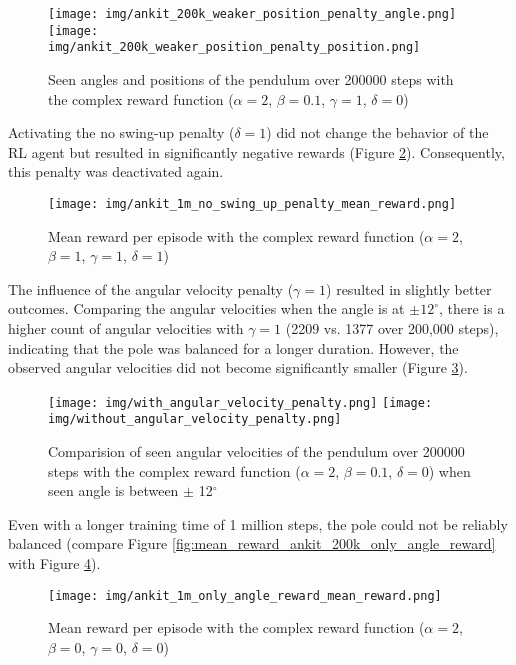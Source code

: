 \begin{figure}[htbp]
    \centering
    \texttt{[image: img/ankit\_200k\_weaker\_position\_penalty\_angle.png]}
    \texttt{[image: img/ankit\_200k\_weaker\_position\_penalty\_position.png]}
    \caption{Seen angles and positions of the pendulum over 200000 steps with the complex reward function ($\alpha=2$, $\beta=0.1$, $\gamma=1$, $\delta=0$)}
    \label{fig:angle_position_ankit_200k_weaker_position_penalty}
\end{figure}
Activating the no swing-up penalty ($\delta=1$) did not change the behavior of the RL agent but resulted in significantly negative rewards (Figure \ref{fig:mean_reward_ankit_1m_no_swing_up_penalty}). Consequently, this penalty was deactivated again.
\begin{figure}[htbp]
    \centering
    \texttt{[image: img/ankit\_1m\_no\_swing\_up\_penalty\_mean\_reward.png]}
    \caption{Mean reward per episode with the complex reward function ($\alpha=2$, $\beta=1$, $\gamma=1$, $\delta=1$)}
    \label{fig:mean_reward_ankit_1m_no_swing_up_penalty}
\end{figure}
The influence of the angular velocity penalty ($\gamma=1$) resulted in slightly better outcomes. Comparing the angular velocities when the angle is at $\pm 12^\circ$, there is a higher count of angular velocities with $\gamma=1$ (2209 vs. 1377 over 200,000 steps), indicating that the pole was balanced for a longer duration. However, the observed angular velocities did not become significantly smaller (Figure \ref{fig:filtered_angular_velocity_ankit_200k_compare_angular_velocity_penalty}).
\begin{figure}[htbp]
    \centering
    \texttt{[image: img/with\_angular\_velocity\_penalty.png]}
    \texttt{[image: img/without\_angular\_velocity\_penalty.png]}
    \caption{Comparision of seen angular velocities of the pendulum over 200000 steps with the complex reward function ($\alpha=2$, $\beta=0.1$, $\delta=0$) when seen angle is between $\pm$ 12$^\circ$}
    \label{fig:filtered_angular_velocity_ankit_200k_compare_angular_velocity_penalty}
\end{figure}
Even with a longer training time of 1 million steps, the pole could not be reliably balanced (compare Figure \ref{fig:mean_reward_ankit_200k_only_angle_reward} with Figure \ref{fig:mean_reward_ankit_1m_only_angle_reward}).
\begin{figure}[htbp]
    \centering
    \texttt{[image: img/ankit\_1m\_only\_angle\_reward\_mean\_reward.png]}
    \caption{Mean reward per episode with the complex reward function ($\alpha=2$, $\beta=0$, $\gamma=0$, $\delta=0$)}
    \label{fig:mean_reward_ankit_1m_only_angle_reward}
\end{figure}

